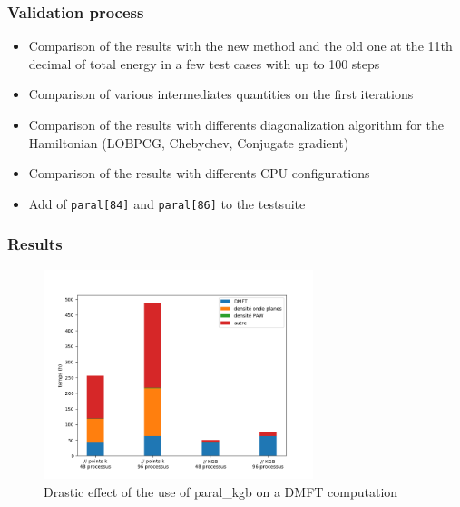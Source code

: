 \begin{frame}
  \frametitle{Validation process}
  \begin{itemize}
    \item Comparison of the results with the new method and the old one at the
      11th decimal of total energy in a few test cases with up to 100 steps
    \item Comparison of various intermediates quantities on the first iterations
    \item Comparison of the results with differents diagonalization algorithm
      for the Hamiltonian (LOBPCG, Chebychev, Conjugate gradient)
    \item Comparison of the results with differents CPU configurations
    \item Add of \texttt{paral[84]} and \texttt{paral[86]} to the testsuite
  \end{itemize}
\end{frame}

\begin{frame}
  \frametitle{Results}
  \begin{figure}[ht]
    \centering
    \includegraphics[width=0.7\textwidth]{pic/bargraph.png}
    \caption{Drastic effect of the use of paral\_kgb on a DMFT computation}
    \label{fig:bargraph.png}
  \end{figure}
\end{frame}
